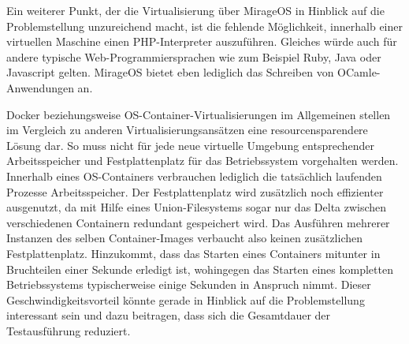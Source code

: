 Ein weiterer Punkt, der die Virtualisierung über MirageOS in Hinblick auf die Problemstellung unzureichend macht, ist die fehlende Möglichkeit, innerhalb einer virtuellen Maschine einen PHP-Interpreter auszuführen. Gleiches würde auch für andere typische Web-Programmiersprachen wie zum Beispiel Ruby, Java oder Javascript gelten. MirageOS bietet eben lediglich das Schreiben von OCamle-Anwendungen an.

Docker beziehungsweise OS-Container-Virtualisierungen im Allgemeinen stellen im Vergleich zu anderen Virtualisierungsansätzen eine resourcensparendere Lösung dar. So muss nicht für jede neue virtuelle Umgebung entsprechender Arbeitsspeicher und Festplattenplatz für das Betriebssystem vorgehalten werden. Innerhalb eines OS-Containers verbrauchen lediglich die tatsächlich laufenden Prozesse Arbeitsspeicher. Der Festplattenplatz wird zusätzlich noch effizienter ausgenutzt, da mit Hilfe eines Union-Filesystems sogar nur das Delta zwischen verschiedenen Containern redundant gespeichert wird. Das Ausführen mehrerer Instanzen des selben Container-Images verbaucht also keinen zusätzlichen Festplattenplatz. Hinzukommt, dass das Starten eines Containers mitunter in Bruchteilen einer Sekunde erledigt ist, wohingegen das Starten eines kompletten Betriebssystems typischerweise einige Sekunden in Anspruch nimmt. Dieser Geschwindigkeitsvorteil könnte gerade in Hinblick auf die Problemstellung interessant sein und dazu beitragen, dass sich die Gesamtdauer der Testausführung reduziert.